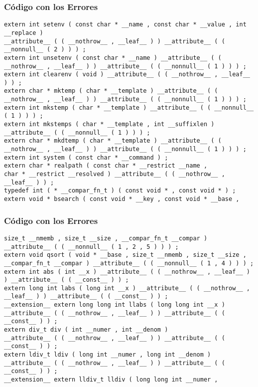 \documentclass{beamer}
\begin{document}
\begin{frame}[fragile]
\frametitle{C\'odigo con los Errores}
\begin{lstlisting}[style=CStyle]
extern int setenv ( const char * __name , const char * __value , int __replace ) 
__attribute__ ( ( __nothrow__ , __leaf__ ) ) __attribute__ ( ( __nonnull__ ( 2 ) ) ) ; 
extern int unsetenv ( const char * __name ) __attribute__ ( ( __nothrow__ , __leaf__ ) ) __attribute__ ( ( __nonnull__ ( 1 ) ) ) ; 
extern int clearenv ( void ) __attribute__ ( ( __nothrow__ , __leaf__ ) ) ; 
extern char * mktemp ( char * __template ) __attribute__ ( ( __nothrow__ , __leaf__ ) ) __attribute__ ( ( __nonnull__ ( 1 ) ) ) ; 
extern int mkstemp ( char * __template ) __attribute__ ( ( __nonnull__ ( 1 ) ) ) ; 
extern int mkstemps ( char * __template , int __suffixlen ) __attribute__ ( ( __nonnull__ ( 1 ) ) ) ; 
extern char * mkdtemp ( char * __template ) __attribute__ ( ( __nothrow__ , __leaf__ ) ) __attribute__ ( ( __nonnull__ ( 1 ) ) ) ; 
extern int system ( const char * __command ) ; 
extern char * realpath ( const char * __restrict __name , 
char * __restrict __resolved ) __attribute__ ( ( __nothrow__ , __leaf__ ) ) ; 
typedef int ( * __compar_fn_t ) ( const void * , const void * ) ; 
extern void * bsearch ( const void * __key , const void * __base , 
\end{lstlisting}
\end{frame}
\begin{frame}[fragile]
\frametitle{C\'odigo con los Errores}
\begin{lstlisting}[style=CStyle]
size_t __nmemb , size_t __size , __compar_fn_t __compar ) 
__attribute__ ( ( __nonnull__ ( 1 , 2 , 5 ) ) ) ; 
extern void qsort ( void * __base , size_t __nmemb , size_t __size , 
__compar_fn_t __compar ) __attribute__ ( ( __nonnull__ ( 1 , 4 ) ) ) ; 
extern int abs ( int __x ) __attribute__ ( ( __nothrow__ , __leaf__ ) ) __attribute__ ( ( __const__ ) ) ; 
extern long int labs ( long int __x ) __attribute__ ( ( __nothrow__ , __leaf__ ) ) __attribute__ ( ( __const__ ) ) ; 
__extension__ extern long long int llabs ( long long int __x ) 
__attribute__ ( ( __nothrow__ , __leaf__ ) ) __attribute__ ( ( __const__ ) ) ; 
extern div_t div ( int __numer , int __denom ) 
__attribute__ ( ( __nothrow__ , __leaf__ ) ) __attribute__ ( ( __const__ ) ) ; 
extern ldiv_t ldiv ( long int __numer , long int __denom ) 
__attribute__ ( ( __nothrow__ , __leaf__ ) ) __attribute__ ( ( __const__ ) ) ; 
__extension__ extern lldiv_t lldiv ( long long int __numer , 
\end{lstlisting}
\end{frame}
\end{document}
